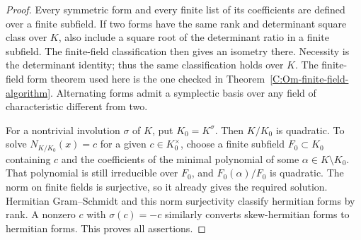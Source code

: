 \begin{proof}
Every symmetric form and every finite list of its coefficients are
defined over a finite subfield. If two forms have the same rank
and determinant square class over $K$, also include a square root
of the determinant ratio in a finite subfield. The finite-field
classification then gives an isometry there. Necessity is the
determinant identity; thus the same classification holds over $K$.
The finite-field form theorem used here is the one checked in
Theorem~\ref{C:Om-finite-field-algorithm}. Alternating forms admit
a symplectic basis over any field of characteristic different from two.

For a nontrivial involution $\sigma$ of $K$, put $K_0=K^\sigma$.
Then $K/K_0$ is quadratic. To solve $N_{K/K_0}(x)=c$ for a given
$c\in K_0^\times$, choose a finite subfield $F_0\subset K_0$
containing $c$ and the coefficients of the minimal polynomial of
some $\alpha\in K\setminus K_0$. That polynomial is still
irreducible over $F_0$, and $F_0(\alpha)/F_0$ is quadratic.
The norm on finite fields is surjective, so it already gives
the required solution. Hermitian Gram--Schmidt and this norm
surjectivity classify hermitian forms by rank. A nonzero
$c$ with $\sigma(c)=-c$ similarly converts skew-hermitian forms
to hermitian forms. This proves all assertions.
\end{proof}

